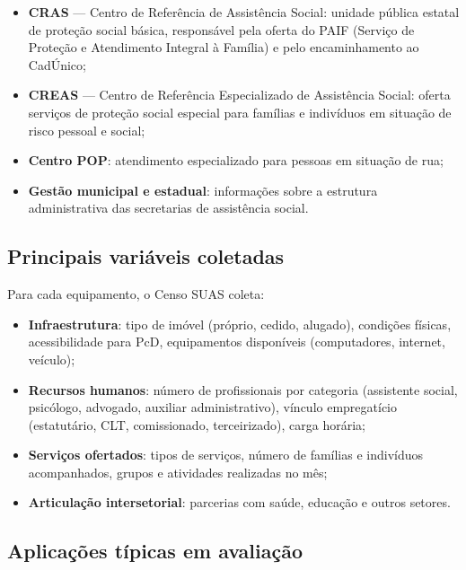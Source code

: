 \begin{itemize}
  \item \textbf{CRAS} — Centro de Referência de Assistência Social: unidade pública estatal de proteção social básica, responsável pela oferta do PAIF (Serviço de Proteção e Atendimento Integral à Família) e pelo encaminhamento ao CadÚnico;
  \item \textbf{CREAS} — Centro de Referência Especializado de Assistência Social: oferta serviços de proteção social especial para famílias e indivíduos em situação de risco pessoal e social;
  \item \textbf{Centro POP}: atendimento especializado para pessoas em situação de rua;
  \item \textbf{Gestão municipal e estadual}: informações sobre a estrutura administrativa das secretarias de assistência social.
\end{itemize}

\subsection{Principais variáveis coletadas}

Para cada equipamento, o Censo SUAS coleta:

\begin{itemize}
  \item \textbf{Infraestrutura}: tipo de imóvel (próprio, cedido, alugado), condições físicas, acessibilidade para PcD, equipamentos disponíveis (computadores, internet, veículo);
  \item \textbf{Recursos humanos}: número de profissionais por categoria (assistente social, psicólogo, advogado, auxiliar administrativo), vínculo empregatício (estatutário, CLT, comissionado, terceirizado), carga horária;
  \item \textbf{Serviços ofertados}: tipos de serviços, número de famílias e indivíduos acompanhados, grupos e atividades realizadas no mês;
  \item \textbf{Articulação intersetorial}: parcerias com saúde, educação e outros setores.
\end{itemize}

\subsection{Aplicações típicas em avaliação}

